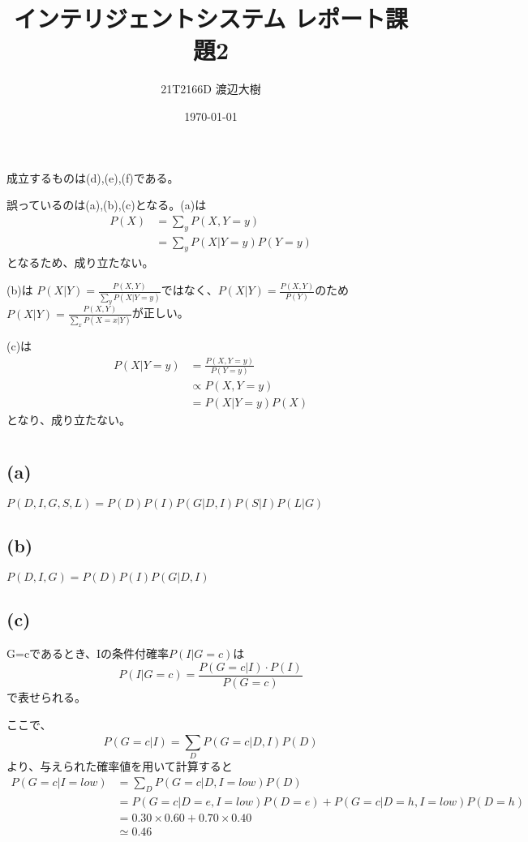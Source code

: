 \documentclass[a4paper,11pt,dvipdfmx]{jsarticle}
\begin{document}
\title{インテリジェントシステム レポート課題2}
\author{21T2166D 渡辺大樹}
\date{\today}
\maketitle

\section{}
成立するものは(d),(e),(f)である。

誤っているのは(a),(b),(c)となる。(a)は
\begin{align*}
    P(X)    &= \sum_{y}P(X,Y = y)\\
            &= \sum_{y}P(X|Y=y)P(Y=y)
\end{align*}
となるため、成り立たない。

(b)は
$P(X|Y)=\frac{P(X,Y)}{\sum_{y}^{}P(X|Y=y)}$ではなく、$P(X|Y)=\frac{P(X,Y)}{P(Y)}$のため
$P(X|Y)=\frac{P(X,Y)}{\sum_{x}^{}P(X=x|Y)}$が正しい。

(c)は
\begin{align*}
    P(X|Y = y)  &= \frac{P(X,Y = y)}{P(Y = y)}\\
                &\propto P(X,Y = y) \\
                &= P(X|Y = y)P(X)
\end{align*}
となり、成り立たない。

\section{}
\subsection*{(a)}
$P(D,I,G,S,L) = P(D)P(I)P(G|D,I)P(S|I)P(L|G)$

\subsection*{(b)}
$P(D,I,G) = P(D)P(I)P(G|D,I)$

\subsection*{(c)}
G=cであるとき、Iの条件付確率$P(I|G=c)$は
\[P(I|G=c)=\frac{P(G=c|I) \cdot P(I)}{P(G=c)}\]
で表せられる。

ここで、
\[P(G=c|I) = \sum_{D}^{}P(G=c|D,I)P(D)\]
より、与えられた確率値を用いて計算すると
\begin{align*}
    P(G=c|I = low)    &= \sum_{D}^{}P(G=c|D,I = low)P(D)\\
                &= P(G=c|D=e,I = low)P(D=e) + P(G=c|D=h,I = low)P(D=h)\\
                &= 0.30 \times 0.60 + 0.70 \times 0.40\\
                &\simeq 0.46
\end{align*}
\end{document}
